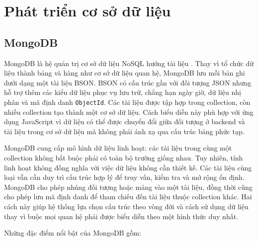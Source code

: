 \section{Phát triển cơ sở dữ liệu}

\subsection{MongoDB}

MongoDB là hệ quản trị cơ sở dữ liệu NoSQL hướng tài liệu \cite{mongodbdocs}. Thay vì tổ chức dữ liệu thành bảng và hàng như cơ sở dữ liệu quan hệ, MongoDB lưu mỗi bản ghi dưới dạng một tài liệu BSON. BSON có cấu trúc gần với đối tượng JSON nhưng hỗ trợ thêm các kiểu dữ liệu phục vụ lưu trữ, chẳng hạn ngày giờ, dữ liệu nhị phân và mã định danh \texttt{ObjectId}. Các tài liệu được tập hợp trong collection, còn nhiều collection tạo thành một cơ sở dữ liệu. Cách biểu diễn này phù hợp với ứng dụng JavaScript vì dữ liệu có thể được chuyển đổi giữa đối tượng ở backend và tài liệu trong cơ sở dữ liệu mà không phải ánh xạ qua cấu trúc bảng phức tạp.

MongoDB cung cấp mô hình dữ liệu linh hoạt: các tài liệu trong cùng một collection không bắt buộc phải có toàn bộ trường giống nhau. Tuy nhiên, tính linh hoạt không đồng nghĩa với việc dữ liệu không cần thiết kế. Các tài liệu cùng loại vẫn cần duy trì cấu trúc hợp lý để truy vấn, kiểm tra và mở rộng ổn định. MongoDB cho phép nhúng đối tượng hoặc mảng vào một tài liệu, đồng thời cũng cho phép lưu mã định danh để tham chiếu đến tài liệu thuộc collection khác. Hai cách này giúp hệ thống lựa chọn cấu trúc theo vòng đời và cách sử dụng dữ liệu thay vì buộc mọi quan hệ phải được biểu diễn theo một hình thức duy nhất.

Những đặc điểm nổi bật của MongoDB gồm:

